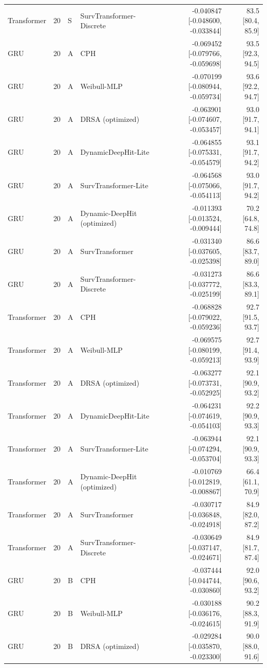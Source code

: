 \begin{longtable}{lll p{3.0cm} rr}
Transformer & 20 & S & SurvTransformer-Discrete & -0.040847 [-0.048600, -0.033844] & 83.5 [80.4, 85.9]\\
GRU & 20 & A & CPH & -0.069452 [-0.079766, -0.059698] & 93.5 [92.3, 94.5]\\
GRU & 20 & A & Weibull-MLP & -0.070199 [-0.080944, -0.059734] & 93.6 [92.2, 94.7]\\
GRU & 20 & A & DRSA (optimized) & -0.063901 [-0.074607, -0.053457] & 93.0 [91.7, 94.1]\\
GRU & 20 & A & DynamicDeepHit-Lite & -0.064855 [-0.075331, -0.054579] & 93.1 [91.7, 94.2]\\
GRU & 20 & A & SurvTransformer-Lite & -0.064568 [-0.075066, -0.054113] & 93.0 [91.7, 94.2]\\
GRU & 20 & A & Dynamic-DeepHit (optimized) & -0.011393 [-0.013524, -0.009444] & 70.2 [64.8, 74.8]\\
GRU & 20 & A & SurvTransformer & -0.031340 [-0.037605, -0.025398] & 86.6 [83.7, 89.0]\\
GRU & 20 & A & SurvTransformer-Discrete & -0.031273 [-0.037772, -0.025199] & 86.6 [83.3, 89.1]\\
Transformer & 20 & A & CPH & -0.068828 [-0.079022, -0.059236] & 92.7 [91.5, 93.7]\\
Transformer & 20 & A & Weibull-MLP & -0.069575 [-0.080199, -0.059213] & 92.7 [91.4, 93.9]\\
Transformer & 20 & A & DRSA (optimized) & -0.063277 [-0.073731, -0.052925] & 92.1 [90.9, 93.2]\\
Transformer & 20 & A & DynamicDeepHit-Lite & -0.064231 [-0.074619, -0.054103] & 92.2 [90.9, 93.3]\\
Transformer & 20 & A & SurvTransformer-Lite & -0.063944 [-0.074294, -0.053704] & 92.1 [90.9, 93.3]\\
Transformer & 20 & A & Dynamic-DeepHit (optimized) & -0.010769 [-0.012819, -0.008867] & 66.4 [61.1, 70.9]\\
Transformer & 20 & A & SurvTransformer & -0.030717 [-0.036848, -0.024918] & 84.9 [82.0, 87.2]\\
Transformer & 20 & A & SurvTransformer-Discrete & -0.030649 [-0.037147, -0.024671] & 84.9 [81.7, 87.4]\\
GRU & 20 & B & CPH & -0.037444 [-0.044744, -0.030860] & 92.0 [90.6, 93.2]\\
GRU & 20 & B & Weibull-MLP & -0.030188 [-0.036176, -0.024615] & 90.2 [88.3, 91.9]\\
GRU & 20 & B & DRSA (optimized) & -0.029284 [-0.035870, -0.023300] & 90.0 [88.0, 91.6]\\

\end{longtable}
